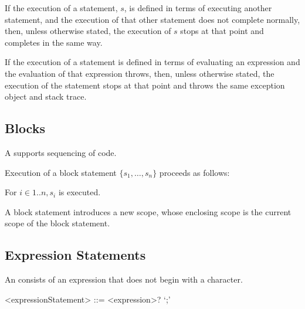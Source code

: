 \documentclass[makeidx]{article}
\begin{document}
\LMHash{}%
If the execution of a statement, $s$,
is defined in terms of executing another statement,
and the execution of that other statement does not complete normally,
then, unless otherwise stated, the execution of $s$ stops
at that point and completes in the same way.

\LMHash{}%
If the execution of a statement is defined in terms of evaluating an expression
and the evaluation of that expression throws,
then, unless otherwise stated, the execution of the statement stops
at that point and throws the same exception object and stack trace.



\subsection{Blocks}

\LMHash{}%
A  supports sequencing of code.

\LMHash{}%
Execution of a block statement $\{s_1, \ldots, s_n\}$ proceeds as follows:

\LMHash{}%
For $i \in 1 .. n, s_i$ is executed.

\LMHash{}%
A block statement introduces a new scope,
whose enclosing scope is the current scope of the block statement.


\subsection{Expression Statements}

\LMHash{}%
An  consists of an expression that does not
begin with a \lit{\{} character.

\begin{grammar}
<expressionStatement> ::= <expression>? `;'
\end{grammar}
\end{document}
